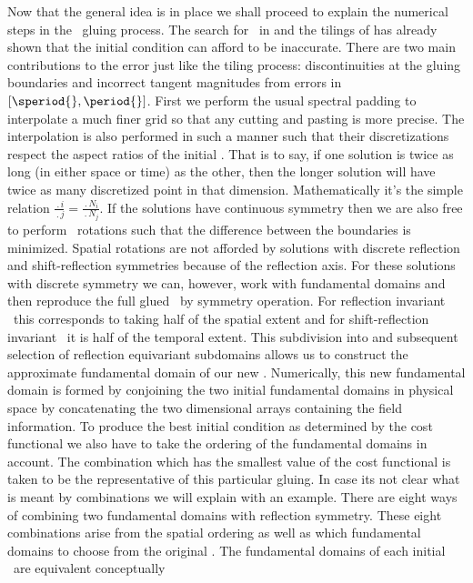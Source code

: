 Now that the general idea is in place we shall proceed to explain
the numerical steps in the \twot\ gluing process.
The search for \twots\ in  and the tilings of 
has already shown that the initial condition can afford to be inaccurate.
There are two main contributions to the error just like the tiling process:
discontinuities at the gluing boundaries and incorrect tangent magnitudes
from errors in $[\speriod{},\period{}]$.
First we perform the usual spectral padding to interpolate a much finer
{\spt} grid so that any cutting and pasting is more precise.
The interpolation is also performed in such a
manner such that their discretizations respect the aspect ratios of
the initial \twots.
That is to say, if one solution is twice as long
(in either space or time) as the other, then the longer solution will have
twice as many discretized point in that dimension. Mathematically
it's the simple relation $\frac{\period{i}}{\period{j}}=\frac{\period{N_i}}{\period{N_j}}$.
If the solutions have continuous symmetry then we are also free to perform
\spt\ rotations such that the difference between the boundaries is minimized.
Spatial rotations are not afforded by solutions with discrete reflection
and shift-reflection symmetries because of the reflection axis.
For these solutions with discrete symmetry we can, however, work with
fundamental domains and then reproduce the full glued \twot\ by
symmetry operation. For reflection invariant \twots\ this corresponds
to taking half of the spatial extent and for shift-reflection invariant
\twots\ it is half of the temporal extent. This
subdivision into and subsequent selection of reflection equivariant subdomains
allows us to construct the approximate fundamental domain of our new \twot.
Numerically, this new fundamental domain is formed by conjoining
the two initial fundamental domains in physical space by concatenating
the two dimensional arrays containing the field information.
To produce the best initial condition as determined by the
cost functional  we also have to take
the ordering of the fundamental domains in account. The combination
which has the smallest value of the cost functional is taken to be the
representative of this particular gluing.
In case its not clear what is meant by combinations
we will explain with an example. There are eight ways of
combining two fundamental domains
with reflection symmetry. These eight combinations arise
from the spatial ordering as well as which fundamental domains to choose from
the original \twots.
The fundamental domains of each initial \twot\ are equivalent conceptually
